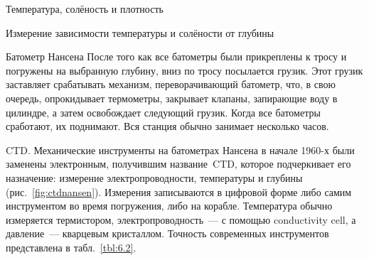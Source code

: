 \begin{chapter}{Температура, солёность и плотность}
\begin{section}{Измерение зависимости температуры и солёности от глубины}
\begin{paragraph}{Батометр Нансена}
После того как все батометры были прикреплены к тросу и погружены на
выбранную глубину, вниз по тросу посылается грузик. Этот грузик
заставляет срабатывать механизм, переворачивающий батометр, что, в свою 
очередь, опрокидывает термометры, закрывает клапаны, запирающие воду в
цилиндре, а затем освобождает следующий грузик. Когда все батометры
сработают, их поднимают. Вся станция обычно занимает несколько часов.
%
\end{paragraph}

\begin{paragraph}{CTD.}
Механические инструменты на батометрах Нансена в начале 1960-х были
заменены электронным, получившим название~CTD, которое подчеркивает его
назначение: измерение электропроводности, температуры и глубины%
 (рис.~\ref{fig:ctdnansen}).
Измерения записываются в цифровой форме либо самим инструментом во время 
погружения, либо на корабле. Температура обычно измеряется термистором, 
электропроводность~--- с помощью conductivity cell, а давление~--- 
кварцевым кристаллом. Точность современных инструментов представлена в 
табл.~\ref{tbl:6.2}.
%


\end{paragraph}
\end{section}
\end{chapter}
